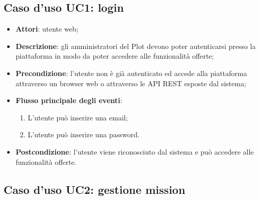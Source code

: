 \subsection{Caso d'uso UC1: login}
\begin{itemize}
\item \textbf{Attori}: utente web;
\item \textbf{Descrizione}: gli amministratori del Plot devono poter autenticarsi presso la piattaforma in modo da poter accedere alle funzionalità offerte; 
      \item \textbf{Precondizione}: l'utente non è già autenticato ed accede alla piattaforma attraverso un browser web o attraverso le API REST esposte dal sistema;

        \item \textbf{Flusso principale degli eventi}:
          \begin{enumerate}
          \item L'utente può inserire una email;
          \item L'utente può inserire una password.

      \end{enumerate}
    \item \textbf{Postcondizione}: l'utente viene riconosciuto dal sistema e può accedere alle funzionalità offerte.
  \end{itemize}
\hypertarget{UC2}{}
\subsection{Caso d'uso UC2: gestione mission}

